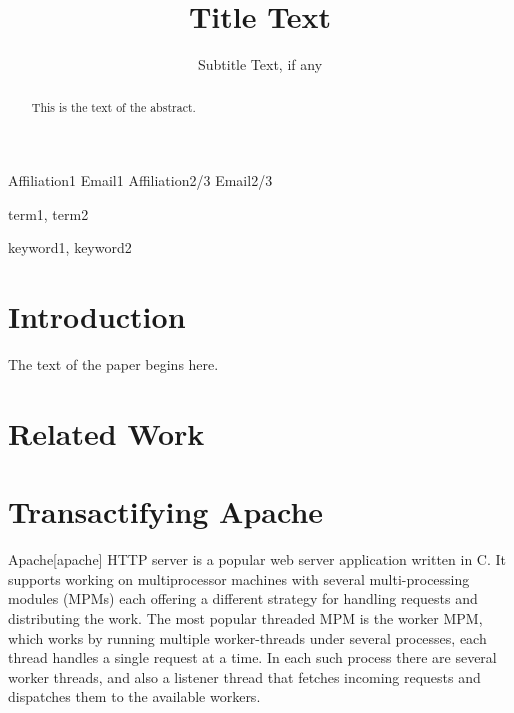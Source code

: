 \documentclass[preprint,natbib,11pt]{sigplanconf}
\begin{document}
\copyrightdata{[to be supplied]} 


\title{Title Text}
\subtitle{Subtitle Text, if any}

           {Affiliation1}
           {Email1}
           {Affiliation2/3}
           {Email2/3}

\maketitle

\begin{abstract}
This is the text of the abstract.
\end{abstract}


\terms
term1, term2

\keywords
keyword1, keyword2

\section{Introduction}

The text of the paper begins here.
\section{Related Work}
\section{Transactifying Apache}
Apache[apache] HTTP server is a popular web server application written in C. It supports working on multiprocessor machines with several multi-processing modules (MPMs) each offering a different strategy for handling requests and distributing the work. The most popular threaded MPM is the worker MPM, which works by running multiple worker-threads under several processes, each thread handles a single request at a time. In each such process there are several worker threads, and also a listener thread that fetches incoming requests and dispatches them to the available workers.
\end{document}
